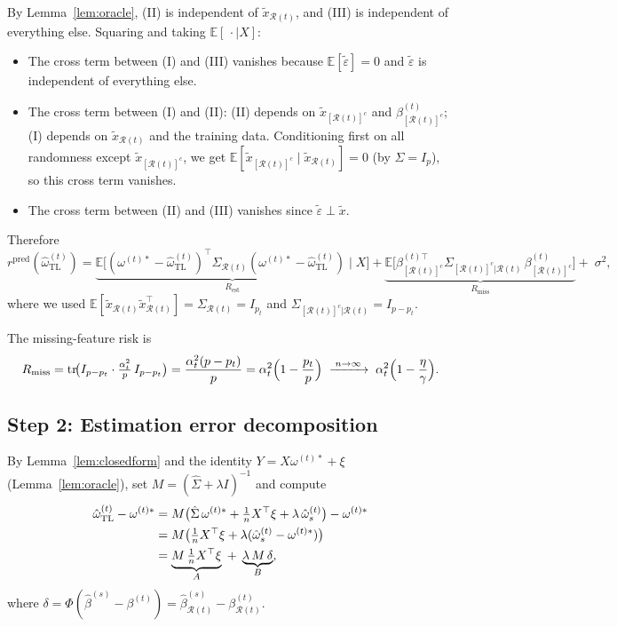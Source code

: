 \documentclass[11pt,a4paper]{article}
\theoremstyle{definition}
\DeclareMathOperator{\tr}{tr}
\newcommand{\E}{\mathbb{E}}
\newcommand{\cR}{\mathcal{R}}
\newcommand{\cRc}{[\cR(t)]^c}
\newcommand{\ohat}{\hat{\omega}_{\mathrm{TL}}^{(t)}}
\newcommand{\ostar}{\omega^{(t)*}}
\newcommand{\bhat}{\hat{\beta}^{(s)}}
\newcommand{\SigR}{\Sigma_{\cR(t)}}
\newcommand{\SigcR}{\Sigma_{\cRc|\cR(t)}}
\begin{document}
By Lemma~\ref{lem:oracle}, (II) is independent of
$\tilde x_{\cR(t)}$, and (III) is independent of everything
else.  Squaring and taking $\E[\,\cdot\mid X]$:
\begin{itemize}[nosep]
\item The cross term between (I) and (III) vanishes because
$\E[\tilde\varepsilon]=0$ and $\tilde\varepsilon$ is independent of
everything else.
\item The cross term between (I) and (II): (II) depends on
$\tilde x_{\cRc}$ and $\beta^{(t)}_{\cRc}$; (I) depends on
$\tilde x_{\cR(t)}$ and the training data.  Conditioning first on all
randomness except $\tilde x_{\cRc}$, we get
$\E[\tilde x_{\cRc}\mid\tilde x_{\cR(t)}]=0$ (by $\Sigma=I_p$), so
this cross term vanishes.
\item The cross term between (II) and (III) vanishes since
$\tilde\varepsilon\perp \tilde x$.
\end{itemize}

Therefore
\begin{equation}\label{eq:decomp}
  r^{\mathrm{pred}}(\ohat)
  =\underbrace{\E\bigl[
  (\ostar-\ohat)^{\top}\SigR(\ostar-\ohat)
  \;\big|\;X\bigr]}_{R_{\mathrm{est}}}
  +\underbrace{\E\bigl[
  \beta^{(t)\top}_{\cRc}\SigcR\,\beta^{(t)}_{\cRc}
  \bigr]}_{R_{\mathrm{miss}}}
  +\;\sigma^{2},
\end{equation}
where we used
$\E[\tilde x_{\cR(t)}\tilde x_{\cR(t)}^{\top}]=\SigR=I_{p_t}$
and $\SigcR=I_{p-p_t}$.

The missing-feature risk is
\[
  R_{\mathrm{miss}}
  =\tr\!\bigl(I_{p-p_t}\cdot\tfrac{\alpha_t^{2}}{p}\,I_{p-p_t}\bigr)
  =\frac{\alpha_t^{2}(p-p_t)}{p}
  =\alpha_t^{2}\Bigl(1-\frac{p_t}{p}\Bigr)
  \;\xrightarrow{\;n\to\infty\;}
  \;\alpha_t^{2}\Bigl(1-\frac{\eta}{\gamma}\Bigr).
\]

\subsection*{Step 2: Estimation error decomposition}

By Lemma~\ref{lem:closedform} and the identity $Y=X\ostar+\xi$
(Lemma~\ref{lem:oracle}), set $M=(\hat\Sigma+\lambda I)^{-1}$ and
compute
\begin{align}
  \ohat-\ostar
  &=M\bigl(\hat\Sigma\,\ostar+\tfrac{1}{n}X^{\top}\xi
  +\lambda\,\hat\omega_s^{(t)}\bigr)-\ostar
  \notag\\
  &=M\bigl(\tfrac{1}{n}X^{\top}\xi
  +\lambda(\hat\omega_s^{(t)}-\ostar)\bigr)
  \notag\\
  &=\underbrace{M\,\tfrac{1}{n}X^{\top}\xi}_{A}
  \;+\;\underbrace{\lambda\,M\,\delta}_{B},
  \label{eq:error_decomp}
\end{align}
where $\delta=\Phi(\bhat-\beta^{(t)})
=\hat\beta^{(s)}_{\cR(t)}-\beta^{(t)}_{\cR(t)}$.
\end{document}
